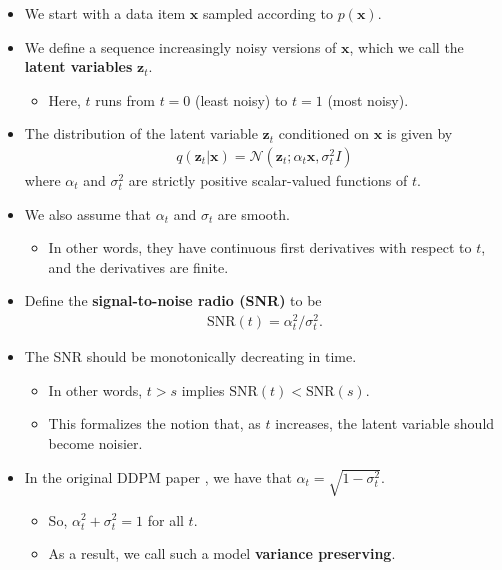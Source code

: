 \documentclass[10pt]{article}
\newcommand{\ve}[1]{\mathbf{#1}}
\newcommand{\N}{\mathcal{N}}
\newcommand{\SNR}{\mathrm{SNR}}
\begin{document}
\begin{itemize}
  \item We start with a data item $\ve{x}$ sampled according to $p(\ve{x})$.
  
  \item We define a sequence increasingly noisy versions of $\ve{x}$, which we call the {\bf latent variables} $\ve{z}_t$.
  \begin{itemize}
    \item Here, $t$ runs from $t=0$ (least noisy) to $t=1$ (most noisy).
  \end{itemize}

  \item The distribution of the latent variable $\ve{z}_t$ conditioned on $\ve{x}$ is given by
  \begin{align}
    q(\ve{z}_t|\ve{x}) = \N(\ve{z}_t ; \alpha_t \ve{x}, \sigma_t^2 I) \label{eq:zt-given-x}
  \end{align}
  where $\alpha_t$ and $\sigma^2_t$ are strictly positive scalar-valued functions of $t$.

  \item We also assume that $\alpha_t$ and $\sigma_t$ are smooth.
  \begin{itemize}
    \item In other words, they have continuous first derivatives with respect to $t$, and the derivatives are finite.
  \end{itemize}  

  \item Define the {\bf signal-to-noise radio (SNR)} to be
  \begin{align*}
    \SNR(t) = \alpha_t^2 / \sigma_t^2.
  \end{align*}
  
  \item The SNR should be monotonically decreating in time.
  \begin{itemize}
    \item In other words, $t > s$ implies $\SNR(t) < \SNR(s)$.
    \item This formalizes the notion that, as $t$ increases, the latent variable should become noisier.
  \end{itemize}  

  \item In the original DDPM paper \cite{Ho:2020}, we have that $\alpha_t = \sqrt{1 - \sigma_t^2}$.
  \begin{itemize}
    \item So, $\alpha_t^2 + \sigma_t^2 = 1$ for all $t$.
    \item As a result, we call such a model {\bf variance preserving}.
  \end{itemize}


\end{itemize}
\end{document}
